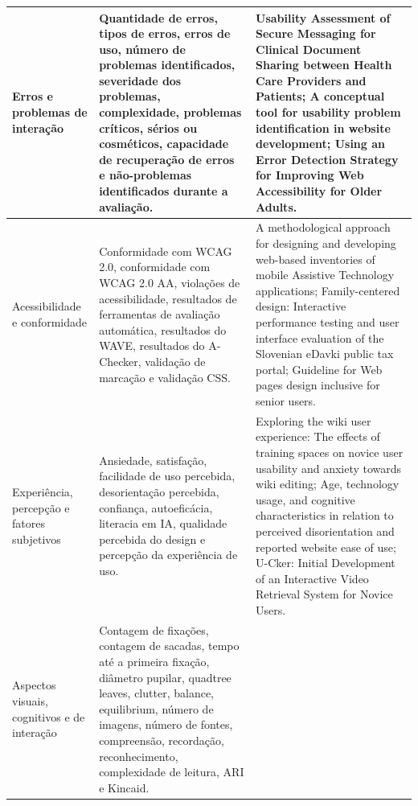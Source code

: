 \begin{longtable}{|p{3.5cm}|p{5.5cm}|p{6cm}|}
Erros e problemas de interação &

Quantidade de erros, tipos de erros, erros de uso, número de problemas identificados, severidade dos problemas, complexidade, problemas críticos, sérios ou cosméticos, capacidade de recuperação de erros e não-problemas identificados durante a avaliação. &

Usability Assessment of Secure Messaging for Clinical Document Sharing between Health Care Providers and Patients; A conceptual tool for usability problem identification in website development; Using an Error Detection Strategy for Improving Web Accessibility for Older Adults. \\ \hline

Acessibilidade e conformidade &

Conformidade com WCAG 2.0, conformidade com WCAG 2.0 AA, violações de acessibilidade, resultados de ferramentas de avaliação automática, resultados do WAVE, resultados do A-Checker, validação de marcação e validação CSS. &

A methodological approach for designing and developing web-based inventories of mobile Assistive Technology applications; Family-centered design: Interactive performance testing and user interface evaluation of the Slovenian eDavki public tax portal; Guideline for Web pages design inclusive for senior users. \\ \hline

Experiência, percepção e fatores subjetivos &

Ansiedade, satisfação, facilidade de uso percebida, desorientação percebida, confiança, autoeficácia, literacia em IA, qualidade percebida do design e percepção da experiência de uso. &

Exploring the wiki user experience: The effects of training spaces on novice user usability and anxiety towards wiki editing; Age, technology usage, and cognitive characteristics in relation to perceived disorientation and reported website ease of use; U-Cker: Initial Development of an Interactive Video Retrieval System for Novice Users. \\ \hline

Aspectos visuais, cognitivos e de interação &

Contagem de fixações, contagem de sacadas, tempo até a primeira fixação, diâmetro pupilar, quadtree leaves, clutter, balance, equilibrium, número de imagens, número de fontes, compreensão, recordação, reconhecimento, complexidade de leitura, ARI e Kincaid. &


\end{longtable}
